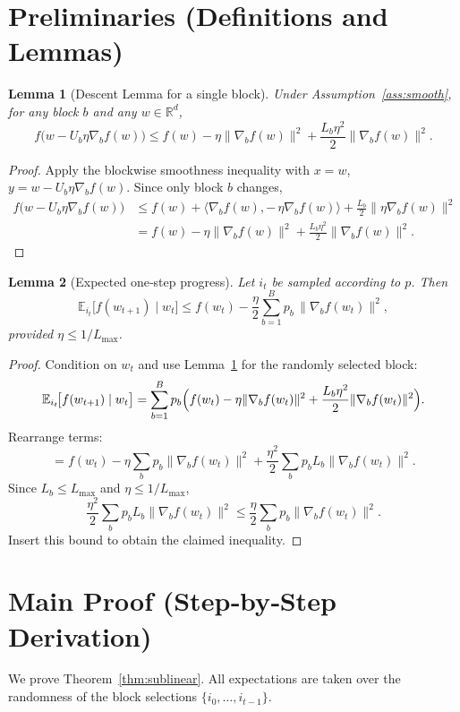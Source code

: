 \documentclass[11pt]{article}
\newtheorem{lemma}{Lemma}
\newcommand{\E}{\mathbb{E}}
\newcommand{\R}{\mathbb{R}}
\begin{document}
\section*{Preliminaries (Definitions and Lemmas)}
\begin{lemma}[Descent Lemma for a single block]\label{lem:descent}
Under Assumption~\ref{ass:smooth}, for any block $b$ and any $w\in\R^{d}$,
\[
f\bigl(w-U_{b}\eta\nabla_{b}f(w)\bigr)
\le f(w)-\eta\|\nabla_{b}f(w)\|^{2}
+\frac{L_b\eta^{2}}{2}\|\nabla_{b}f(w)\|^{2}.
\]
\end{lemma}
\begin{proof}
Apply the blockwise smoothness inequality with $x=w$,
$y=w-U_{b}\eta\nabla_{b}f(w)$.  Since only block $b$ changes,
\[
\begin{aligned}
f\bigl(w-U_{b}\eta\nabla_{b}f(w)\bigr)
&\le f(w)+\langle\nabla_{b}f(w),-\,\eta\nabla_{b}f(w)\rangle
+\frac{L_b}{2}\|\eta\nabla_{b}f(w)\|^{2}\\
&= f(w)-\eta\|\nabla_{b}f(w)\|^{2}
+\frac{L_b\eta^{2}}{2}\|\nabla_{b}f(w)\|^{2}.
\end{aligned}
\]
\end{proof}

\begin{lemma}[Expected one‑step progress]\label{lem:exp_progress}
Let $i_t$ be sampled according to $p$. Then
\[
\E_{i_t}\!\bigl[f(w_{t+1})\mid w_t\bigr]
\le f(w_t)-\frac{\eta}{2}\sum_{b=1}^{B}p_b\,
\|\nabla_{b}f(w_t)\|^{2},
\]
provided $\eta\le 1/L_{\max}$.
\end{lemma}
\begin{proof}
Condition on $w_t$ and use Lemma~\ref{lem:descent} for the randomly selected block:
\[
\E_{i_t}\!\bigl[f(w_{t+1})\mid w_t\bigr]
= \sum_{b=1}^{B}p_b
\Bigl(f(w_t)-\eta\|\nabla_{b}f(w_t)\|^{2}
+\frac{L_b\eta^{2}}{2}\|\nabla_{b}f(w_t)\|^{2}\Bigr).
\]
Rearrange terms:
\[
= f(w_t)-\eta\sum_{b}p_b\|\nabla_{b}f(w_t)\|^{2}
+\frac{\eta^{2}}{2}\sum_{b}p_bL_b\|\nabla_{b}f(w_t)\|^{2}.
\]
Since $L_b\le L_{\max}$ and $\eta\le 1/L_{\max}$,
\[
\frac{\eta^{2}}{2}\sum_{b}p_bL_b\|\nabla_{b}f(w_t)\|^{2}
\le\frac{\eta}{2}\sum_{b}p_b\|\nabla_{b}f(w_t)\|^{2}.
\]
Insert this bound to obtain the claimed inequality. \qedhere
\end{proof}

\section*{Main Proof (Step‑by‑Step Derivation)}
We prove Theorem~\ref{thm:sublinear}.  
All expectations are taken over the randomness of the block selections
$\{i_0,\dots,i_{t-1}\}$.
\end{document}
